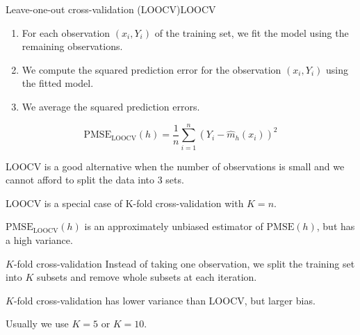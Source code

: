 \begin{definition}{Leave-one-out cross-validation (LOOCV)}{LOOCV}
	\begin{enumerate}
		\item For each observation $(x_i, Y_i)$ of the training set, we fit the model
		      using the remaining observations.
		\item We compute the squared prediction error for the observation $(x_i, Y_i)$
		      using the fitted model.
		\item We average the squared prediction errors.
	\end{enumerate}
	\begin{equation*}
		\text{PMSE}_\text{LOOCV}(h) = \frac{1}{n} \sum_{i=1}^n \left( Y_i - \hat m_h(x_i) \right)^2
	\end{equation*}
	\tcblower
	\begin{note}
		LOOCV is a good alternative when the number of observations is small and we cannot
		afford to split the data into 3 sets.
	\end{note}
	\begin{note}
		LOOCV is a special case of K-fold cross-validation with $K=n$.
	\end{note}
	\begin{note}
		$\text{PMSE}_\text{LOOCV}(h)$ is an approximately unbiased estimator of $\text{PMSE}(h)$,
		but has a high variance.
	\end{note}
\end{definition}

\begin{definition}{$K$-fold cross-validation}{}
	Instead of taking one observation, we split the training set into $K$ subsets
	and remove whole subsets at each iteration.

	\tcblower
	\begin{note}
		$K$-fold cross-validation has lower variance than LOOCV, but larger bias.
	\end{note}
	Usually we use $K=5$ or $K=10$.
\end{definition}

